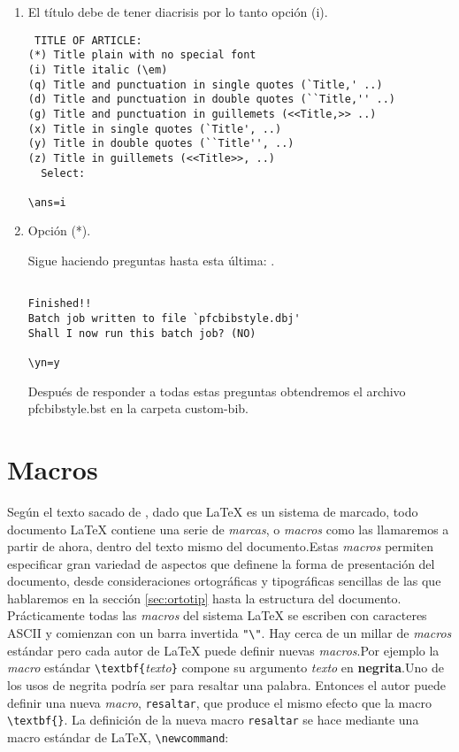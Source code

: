 \begin{enumerate}
\begin{verbatim}
\ans=*
\end{verbatim}

\item El título debe de tener diacrisis por lo tanto opción (i).

\begin{verbatim}
 TITLE OF ARTICLE:
(*) Title plain with no special font
(i) Title italic (\em)
(q) Title and punctuation in single quotes (`Title,' ..)
(d) Title and punctuation in double quotes (``Title,'' ..)
(g) Title and punctuation in guillemets (<<Title,>> ..)
(x) Title in single quotes (`Title', ..)
(y) Title in double quotes (``Title'', ..)
(z) Title in guillemets (<<Title>>, ..)
  Select:

\ans=i
\end{verbatim}



\item Opción (*).

Sigue haciendo preguntas hasta esta última:
.
\begin{verbatim}

Finished!!
Batch job written to file `pfcbibstyle.dbj'
Shall I now run this batch job? (NO)

\yn=y
\end{verbatim}
Después de responder a todas estas preguntas obtendremos el archivo pfcbibstyle.bst en la carpeta  custom-bib.








\end{enumerate}




\pagebreak

	
\section{Macros}\label{macro}
Según el texto sacado de \cite{valiente}, dado que \LaTeX{} es un sistema de marcado, todo documento \LaTeX{} contiene una serie de \emph{marcas}, o \emph{macros} como las llamaremos a partir de ahora, dentro del texto mismo del documento.Estas \emph{macros} permiten especificar gran variedad de aspectos que definene la forma de presentación del documento, desde consideraciones ortográficas y tipográficas sencillas de las que hablaremos en la sección \ref{sec:ortotip} hasta la estructura del documento.
Prácticamente todas las \emph{macros} del sistema \LaTeX{} se escriben con caracteres ASCII y comienzan con un barra invertida \verb|"\"|. Hay cerca de un millar de \emph{macros} estándar pero cada autor de \LaTeX{} puede definir nuevas \emph{macros}.Por ejemplo la \emph{macro} estándar \verb|\textbf{|\emph{texto}\verb|}| compone su argumento \emph{texto} en \textbf{negrita}.Uno de los usos de negrita podría ser para resaltar una palabra. Entonces el autor puede definir una nueva \emph{macro}, \verb|resaltar|, que produce el mismo efecto que la macro \verb|\textbf{}|.
La definición de la nueva macro \verb|resaltar| se hace mediante una macro estándar de \LaTeX, \verb|\newcommand|: \\

